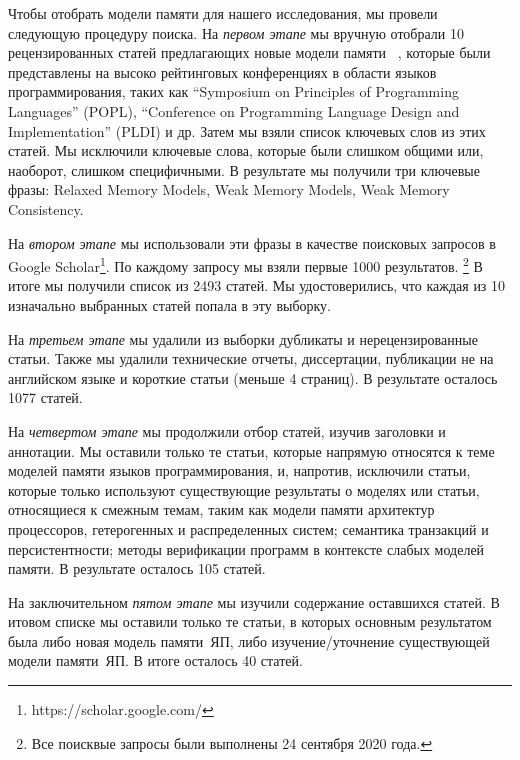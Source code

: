 Чтобы отобрать модели памяти для нашего исследования, 
мы провели следующую процедуру поиска. 
На \emph{первом этапе} мы вручную отобрали 10 рецензированных статей 
предлагающих новые модели памяти~%
\cite{
Manson-al:POPL05,
Batty-al:POPL11,
Lahav-al:PLDI17,
Dolan-al:PLDI18,
Watt-al:PLDI2020,
Jeffrey-Riely:LICS16,
PichonPharabod-Sewell:POPL16,
Kang-al:POPL17,
Chakraborty-Vafeiadis:POPL19,
Paviotti-al:ESOP20
},
которые были представлены на высоко рейтинговых конференциях
в области языков программирования, таких как
``Symposium on Principles of Programming Languages'' (POPL),
``Conference on Programming Language Design and Implementation'' (PLDI) 
и др. Затем мы взяли список ключевых слов из этих статей. 
Мы исключили ключевые слова, которые были слишком общими
или, наоборот, слишком специфичными. 
В результате мы получили три ключевые фразы: Relaxed Memory Models, Weak Memory Models, Weak Memory Consistency.

На \emph{втором этапе} мы использовали эти фразы в
качестве поисковых запросов в Google Scholar\footnote{https://scholar.google.com/}.
По каждому запросу мы взяли первые 1000 результатов.%
\footnote{Все поисквые запросы были выполнены 24 сентября 2020 года.}
В итоге мы получили список из 2493 статей. 
Мы удостоверились, что каждая из 10 изначально выбранных статей 
попала в эту выборку. 

На \emph{третьем этапе} мы удалили из выборки дубликаты и нерецензированные статьи. 
Также мы удалили технические отчеты, диссертации, 
публикации не на английском языке и короткие статьи (меньше 4 страниц). 
В результате осталось 1077 статей. 

На \emph{четвертом этапе} мы продолжили отбор статей, изучив 
заголовки и аннотации. 
Мы оставили только те статьи, которые напрямую относятся 
к теме моделей памяти языков программирования, 
и, напротив, исключили статьи, которые только используют 
существующие результаты о моделях или статьи, относящиеся 
к смежным темам, таким как
 модели памяти архитектур процессоров, гетерогенных и распределенных систем; семантика транзакций и персистентности; методы верификации программ в контексте слабых моделей памяти.
В результате осталось 105 статей.

На заключительном \emph{пятом этапе} мы изучили содержание оставшихся статей. 
В итовом списке мы оставили только те статьи, в которых основным результатом была либо новая модель памяти~ЯП, либо изучение/уточнение существующей модели памяти~ЯП.
В итоге осталось 40 статей.